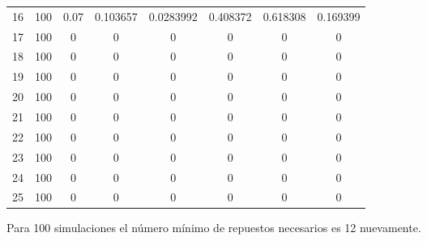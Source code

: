 \begin{table}[h]
{\begin{tabular}{|c|c|c|c|c|c|c|c|}
16 & 100 & 0.07 & 0.103657 & 0.0283992 & 0.408372 & 0.618308 & 0.169399 \\
17 & 100 & 0 & 0 & 0 & 0 & 0 & 0 \\
18 & 100 & 0 & 0 & 0 & 0 & 0 & 0 \\
19 & 100 & 0 & 0 & 0 & 0 & 0 & 0 \\
20 & 100 & 0 & 0 & 0 & 0 & 0 & 0 \\
21 & 100 & 0 & 0 & 0 & 0 & 0 & 0 \\
22 & 100 & 0 & 0 & 0 & 0 & 0 & 0 \\
23 & 100 & 0 & 0 & 0 & 0 & 0 & 0 \\
24 & 100 & 0 & 0 & 0 & 0 & 0 & 0 \\
25 & 100 & 0 & 0 & 0 & 0 & 0 & 0 \\ \hline
\end{tabular}%
}
\end{table}

Para 100 simulaciones el número mínimo de repuestos necesarios es 12 nuevamente.

\newpage

